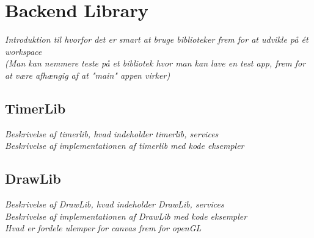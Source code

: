 \section{Backend Library}
\textit{Introduktion til hvorfor det er smart at bruge biblioteker frem for at udvikle på ét workspace\\
(Man kan nemmere teste på et bibliotek hvor man kan lave en test app, frem for at være afhængig af at "main" appen virker)}

\subsection{TimerLib}
\textit{Beskrivelse af timerlib, hvad indeholder timerlib, services\\
Beskrivelse af implementationen af timerlib med kode eksempler}

\subsection{DrawLib}
\textit{Beskrivelse af DrawLib, hvad indeholder DrawLib, services\\
Beskrivelse af implementationen af DrawLib med kode eksempler\\
Hvad er fordele ulemper for canvas frem for openGL}